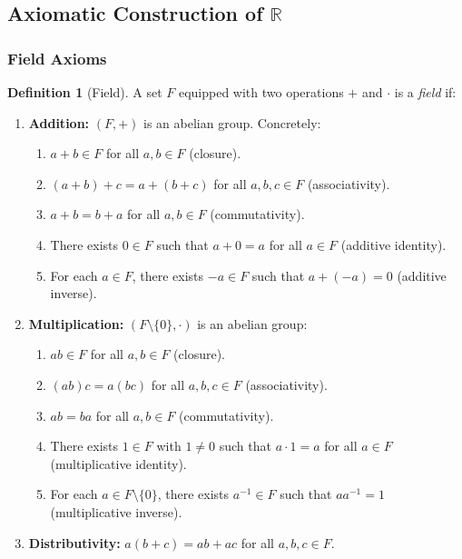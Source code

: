 \documentclass[12pt]{article}
\numberwithin{equation}{section}
\newcommand{\RR}{\mathbb{R}}
\theoremstyle{plain}
\theoremstyle{definition}
\newtheorem{definition}[theorem]{Definition}
\theoremstyle{remark}
\begin{document}
\subsection{Axiomatic Construction of $\RR$}

\subsubsection{Field Axioms}

\begin{definition}[Field]
A set $F$ equipped with two operations $+$ and $\cdot$ is a \emph{field} if:
\begin{enumerate}[label=(F\arabic*)]
\item \textbf{Addition:} $(F,+)$ is an abelian group. Concretely:
  \begin{enumerate}[label=(\alph*)]
    \item $a+b\in F$ for all $a,b\in F$ (closure).
    \item $(a+b)+c=a+(b+c)$ for all $a,b,c\in F$ (associativity).
    \item $a+b=b+a$ for all $a,b\in F$ (commutativity).
    \item There exists $0\in F$ such that $a+0=a$ for all $a\in F$ (additive identity).
    \item For each $a\in F$, there exists $-a\in F$ such that $a+(-a)=0$ (additive inverse).
  \end{enumerate}
\item \textbf{Multiplication:} $(F\setminus\{0\},\cdot)$ is an abelian group:
  \begin{enumerate}[label=(\alph*)]
    \item $ab\in F$ for all $a,b\in F$ (closure).
    \item $(ab)c=a(bc)$ for all $a,b,c\in F$ (associativity).
    \item $ab=ba$ for all $a,b\in F$ (commutativity).
    \item There exists $1\in F$ with $1\neq 0$ such that $a\cdot 1=a$ for all $a\in F$ (multiplicative identity).
    \item For each $a\in F\setminus\{0\}$, there exists $a^{-1}\in F$ such that $aa^{-1}=1$ (multiplicative inverse).
  \end{enumerate}
\item \textbf{Distributivity:} $a(b+c)=ab+ac$ for all $a,b,c\in F$.
\end{enumerate}
\end{definition}
\end{document}
